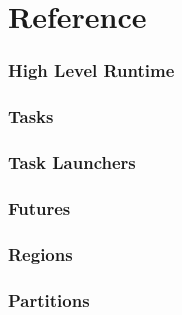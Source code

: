 \part{Reference}

\section{High Level Runtime}

\section{Tasks}

\section{Task Launchers}

\section{Futures}

\section{Regions}

\section{Partitions}
